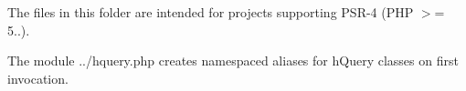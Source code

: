 The files in this folder are intended for projects supporting P\+S\+R-\/4 (P\+HP $>$= 5..).

The module {\ttfamily ../hquery.php} creates namespaced aliases for h\+Query classes on first invocation. 